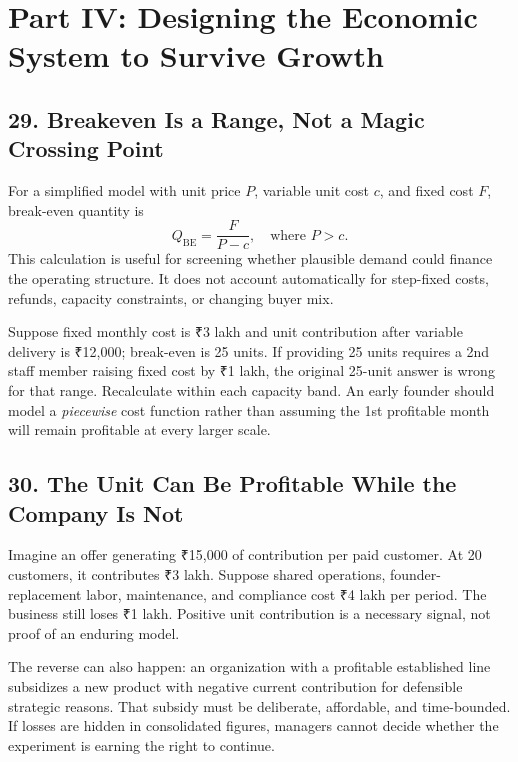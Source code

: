 \section*{Part IV: Designing the Economic System to Survive Growth}

\subsection*{29. Breakeven Is a Range, Not a Magic Crossing Point}

For a simplified model with unit price $P$, variable unit cost $c$, and fixed cost $F$, break-even quantity is
\begin{equation}
Q_{\text{BE}} = \frac{F}{P - c}, \quad \text{where } P > c.
\end{equation}
This calculation is useful for screening whether plausible demand could finance the operating structure. It does not account automatically for step-fixed costs, refunds, capacity constraints, or changing buyer mix.

Suppose fixed monthly cost is ₹3 lakh and unit contribution after variable delivery is ₹12,000; break-even is 25 units. If providing 25 units requires a 2nd staff member raising fixed cost by ₹1 lakh, the original 25-unit answer is wrong for that range. Recalculate within each capacity band. An early founder should model a \emph{piecewise} cost function rather than assuming the 1st profitable month will remain profitable at every larger scale.

\subsection*{30. The Unit Can Be Profitable While the Company Is Not}

Imagine an offer generating ₹15,000 of contribution per paid customer. At 20 customers, it contributes ₹3 lakh. Suppose shared operations, founder-replacement labor, maintenance, and compliance cost ₹4 lakh per period. The business still loses ₹1 lakh. Positive unit contribution is a necessary signal, not proof of an enduring model.

The reverse can also happen: an organization with a profitable established line subsidizes a new product with negative current contribution for defensible strategic reasons. That subsidy must be deliberate, affordable, and time-bounded. If losses are hidden in consolidated figures, managers cannot decide whether the experiment is earning the right to continue.

